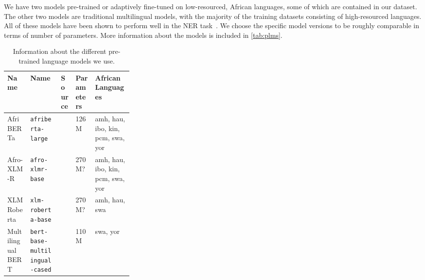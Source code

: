\documentclass{article}
\newcommand{\afriberta}{AfriBERTa\xspace}
\newcommand{\afroxlmr}{Afro-XLM-R\xspace}
\begin{document}
We have two models pre-trained or adaptively fine-tuned on low-resourced, African languages, some of which are contained in our dataset. The other two models are traditional multilingual models, with the majority of the training datasets consisting of high-resourced languages. All of these models have been shown to perform well in the NER task~\citep{adelani2021MasakhaNER,ogueji2021Small,alabi2022Multilingual}. We choose the specific model versions to be roughly comparable in terms of number of parameters. More information about the models is included in \autoref{tab:plms}.


\begin{table}[h]
    \centering
    \caption{Information about the different pre-trained language models we use.}
    \label{tab:plms}
    \begin{adjustbox}{width=1\linewidth}
    \begin{tabular}{llllp{0.3\linewidth}}
        \toprule
        Name & Name & Source & Parameters & African Languages \\
        \midrule
        \afriberta & {\texttt{afriberta-large}} & \citet{ogueji2021Small} & 126M  & amh, hau, ibo, kin, pcm, swa, yor \\
        \afroxlmr & \texttt{afro-xlmr-base} & \citet{alabi2022Multilingual} & 270M?  & amh, hau, ibo, kin, pcm, swa, yor \\
        XLM Roberta & \texttt{xlm-roberta-base} & \citet{conneau2019Unsupervised} & 270M?  & amh, hau, swa \\
        Multilingual BERT & \texttt{bert-base-multilingual-cased} & \citet{devlin2019BERT} & 110M  & swa, yor \\
        \bottomrule
    \end{tabular}
    \end{adjustbox}
\end{table}
\end{document}
